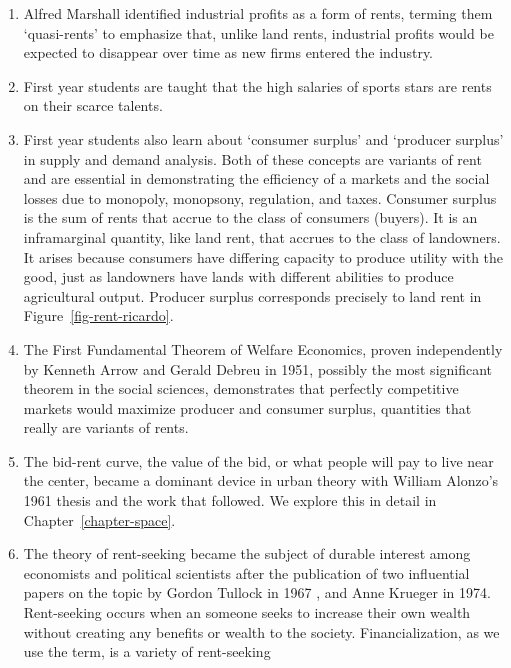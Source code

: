 \begin{enumerate}
    \item Alfred Marshall identified industrial profits as a form of rents, terming them `quasi-rents' to emphasize that, unlike land rents, industrial profits would  be expected to disappear over time as new firms entered the industry.
    \item First year students are taught that the high salaries of  sports stars are rents on their scarce talents. 
    \item First year students also learn about `consumer surplus' and `producer surplus' in supply and demand analysis. Both of these concepts are variants of rent and are essential in demonstrating the efficiency of a markets and the social losses due to \gls{monopoly}, \gls{monopsony}, regulation, and taxes. Consumer surplus is the sum of rents that accrue to the class of consumers (buyers). It is an \gls{inframarginal} quantity, like land  rent, that accrues to the class of landowners. It arises because consumers have differing capacity to produce  utility with the good, just as landowners have lands with different abilities to produce agricultural output. Producer surplus corresponds precisely to land rent in Figure~\ref{fig-rent-ricardo}.  
    \item The First Fundamental Theorem of Welfare Economics, proven independently by Kenneth Arrow \cite{arrowExtensionBasicTheorems1951}and  Gerald Debreu \cite{debreuCoefficientResourceUtilization1951}  in 1951, possibly the most significant theorem in the social sciences, demonstrates that perfectly competitive markets would maximize producer and consumer surplus, quantities that really are variants of rents.
    \item The \gls{bid-rent curve}, the value of the bid, or what people will pay to live near the center, became a dominant device  in urban theory with William Alonzo's 1961 thesis \cite{alonzoTheoryUrbanLand1960} and the work that followed. We explore this in detail in Chapter~\ref{chapter-space}. %
    \item The theory of \gls{rent-seeking}  became the subject of durable interest among economists and political scientists after the publication of two influential papers on the topic by Gordon Tullock in 1967 \cite{tullockWelfareCostsTariffs1967}, and Anne Krueger \cite{kruegerPoliticalEconomyRentSeeking1974} in 1974. Rent-seeking occurs when an someone seeks to increase their own wealth without creating any benefits or wealth to the society. Financialization, as we use the term, is a variety of rent-seeking
\end{enumerate}


